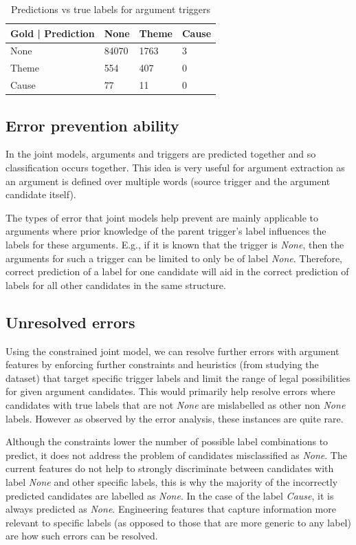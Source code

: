 \documentclass{article} %
\begin{document}
\begin{table}[htb]
\centering
\caption{Predictions vs true labels for argument triggers}
\label{table:args_results}
\begin{tabular}{|l|l|l|l|}
\hline
Gold | Prediction & None & Theme & Cause \\ \hline
None & 84070 & 1763 & 3 \\ \hline
Theme & 554 & 407 & 0 \\ \hline
Cause & 77 & 11 & 0 \\ \hline
\end{tabular}
\end{table}

\subsection{Error prevention ability}
In the joint models, arguments and triggers are predicted together and so classification occurs together. This idea is very useful for argument extraction as an argument is defined over multiple words (source trigger and the argument candidate itself).

The types of error that joint models help prevent are mainly applicable to arguments where prior knowledge of the parent trigger's label influences the labels for these arguments. E.g., if it is known that the trigger is \emph{None}, then the arguments for such a trigger can be limited to only be of label \emph{None}. Therefore, correct prediction of a label for one candidate will aid in the correct prediction of labels for all other candidates in the same structure.


\subsection{Unresolved errors}
Using the constrained joint model, we can resolve further errors with argument features by enforcing further constraints and heuristics (from studying the dataset) that target specific trigger labels and limit the range of legal possibilities for given argument candidates. This would primarily help resolve errors where candidates with true labels that are not \emph{None} are mislabelled as other non \emph{None} labels. However as observed by the error analysis, these instances are quite rare. 

Although the constraints lower the number of possible label combinations to predict, it does not address the problem of candidates misclassified as \emph{None}. The current features do not help to strongly discriminate between candidates with label \emph{None} and other specific labels, this is why the majority of the incorrectly predicted candidates are labelled as \emph{None}. In the case of the label \emph{Cause}, it is always predicted as \emph{None}. Engineering features that capture information more relevant to specific labels (as opposed to those that are more generic to any label) are how such errors can be resolved.
\end{document}
